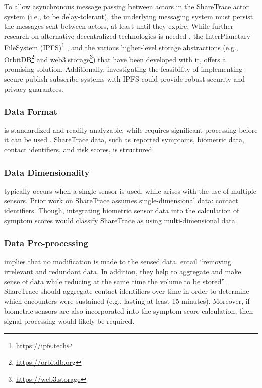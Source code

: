 To allow asynchronous message passing between actors in the ShareTrace actor system (i.e., to be delay-tolerant), the underlying messaging system must persist the messages sent between actors, at least until they expire. While further research on alternative decentralized technologies is needed \citep{Troncoso2017, Keizer2024}, the InterPlanetary FileSystem (IPFS)\footnote{\url{https://ipfs.tech}} \citep{Benet2014, Trautwein2022, Shi2024}, and the various higher-level storage abstractions (e.g., OrbitDB\footnote{\url{https://orbitdb.org}} and web3.storage\footnote{\url{https://web3.storage}}) that have been developed with it, offers a promising solution. Additionally, investigating the feasibility of implementing secure publish-subscribe systems \citep{Cui2021} with IPFS could provide robust security and privacy guarantees. 

\subsubsection{Data Format}

 is standardized and readily analyzable, while  requires significant processing before it can be used \citep{Capponi2019}. ShareTrace data, such as reported symptoms, biometric data, contact identifiers, and risk scores, is structured.

\subsubsection{Data Dimensionality}

 typically occurs when a single sensor is used, while  arises with the use of multiple sensors. Prior work on ShareTrace assumes single-dimensional data: contact identifiers. Though, integrating biometric sensor data into the calculation of symptom scores would classify ShareTrace as using multi-dimensional data.

\subsubsection{Data Pre-processing}

 implies that no modification is made to the sensed data.  entail ``removing irrelevant and redundant data. In addition, they help to aggregate and make sense of data while reducing at the same time the volume to be stored'' \citep{Capponi2019}. ShareTrace should aggregate contact identifiers over time in order to determine which encounters were sustained (e.g., lasting at least 15 minutes). Moreover, if biometric sensors are also incorporated into the symptom score calculation, then signal processing would likely be required.

